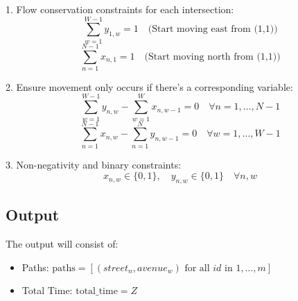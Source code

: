 \documentclass{article}
\begin{document}
1. Flow conservation constraints for each intersection:
\[
\sum_{w=1}^{W-1} y_{1,w} = 1 \quad \text{(Start moving east from (1,1))}
\]
\[
\sum_{n=1}^{N-1} x_{n,1} = 1 \quad \text{(Start moving north from (1,1))}
\]

2. Ensure movement only occurs if there's a corresponding variable:
\[
\sum_{w=1}^{W-1} y_{n,w} - \sum_{w=1}^{W} x_{n,w-1} = 0 \quad \forall n = 1, \ldots, N-1
\]
\[
\sum_{n=1}^{N-1} x_{n,w} - \sum_{n=1}^{N} y_{n,w-1} = 0 \quad \forall w = 1, \ldots, W-1
\]

3. Non-negativity and binary constraints:
\[
x_{n,w} \in \{0, 1\}, \quad y_{n,w} \in \{0, 1\} \quad \forall n, w
\]

\subsection*{Output}
The output will consist of:
\begin{itemize}
    \item Paths: $\text{paths} = [(street_n, avenue_w) \text{ for all } id \text{ in } 1,\ldots,m]$
    \item Total Time: $\text{total_time} = Z$
\end{itemize}
\end{document}
